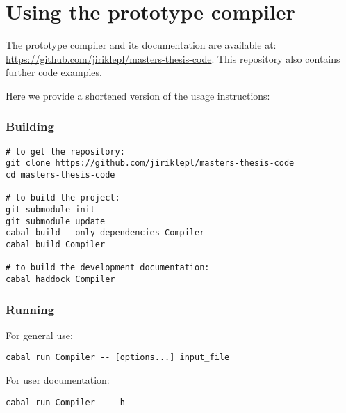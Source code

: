 \chapter{Using the prototype compiler}
\label{chap:proto}

The prototype compiler and its documentation are available at: \url{https://github.com/jiriklepl/masters-thesis-code}. This repository also contains further code examples.

Here we provide a shortened version of the usage instructions:

\subsection*{Building}

\begin{lstlisting}[language=Sh]
# to get the repository:
git clone https://github.com/jiriklepl/masters-thesis-code
cd masters-thesis-code

# to build the project:
git submodule init
git submodule update
cabal build --only-dependencies Compiler
cabal build Compiler

# to build the development documentation:
cabal haddock Compiler
\end{lstlisting}

\subsection*{Running}

For general use:

\begin{lstlisting}[language=Sh]
cabal run Compiler -- [options...] input_file
\end{lstlisting}

\noindent For user documentation:

\begin{lstlisting}[language=Sh]
cabal run Compiler -- -h
\end{lstlisting}
